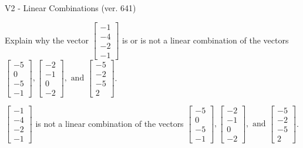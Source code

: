 \begin{exercise}
  \begin{exerciseTitle}V2 - Linear Combinations (ver. 641)\end{exerciseTitle}
  \begin{exerciseStatement}
    Explain why the vector \(\left[\begin{array}{c}
-1 \\
-4 \\
-2 \\
-1
\end{array}\right]\)  is or is not a linear 
	combination of the vectors \(\left[\begin{array}{c}
-5 \\
0 \\
-5 \\
-1
\end{array}\right] , \left[\begin{array}{c}
-2 \\
-1 \\
0 \\
-2
\end{array}\right] , \text{ and } \left[\begin{array}{c}
-5 \\
-2 \\
-5 \\
2
\end{array}\right]\).
	


  \end{exerciseStatement}
  \begin{exerciseAnswer}
   \(\left[\begin{array}{c}
-1 \\
-4 \\
-2 \\
-1
\end{array}\right]\) 
  	 is not  
	a linear combination of the vectors \(\left[\begin{array}{c}
-5 \\
0 \\
-5 \\
-1
\end{array}\right] , \left[\begin{array}{c}
-2 \\
-1 \\
0 \\
-2
\end{array}\right] , \text{ and } \left[\begin{array}{c}
-5 \\
-2 \\
-5 \\
2
\end{array}\right]\).

	
  


  \end{exerciseAnswer}
\end{exercise}